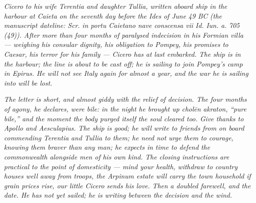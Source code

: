 
\textit{Cicero to his wife Terentia and daughter Tullia,
written aboard ship in the harbour at Caieta on the
seventh day before the Ides of June 49 BC (the
manuscript dateline: \textit{Scr. in portu Caietano
nave conscensa vii Id. Iun. a. 705 (49)}). After more
than four months of paralysed indecision in his Formian
villa --- weighing his consular dignity, his obligation
to Pompey, his promises to Caesar, his terror for his
family --- Cicero has at last embarked. The ship is in
the harbour; the line is about to be cast off; he is
sailing to join Pompey's camp in Epirus. He will not
see Italy again for almost a year, and the war he is
sailing into will be lost.}

\textit{The letter is short, and almost giddy with the
relief of decision. The four months of agony, he
declares, were bile: in the night he brought up
\textit{chol\=en akraton}, ``pure bile,'' and the moment
the body purged itself the soul cleared too. Give thanks
to Apollo and Aesculapius. The ship is good; he will
write to friends from on board commending Terentia and
Tullia to them; he need not urge them to courage,
knowing them braver than any man; he expects in time to
defend the commonwealth alongside men of his own kind.
The closing instructions are practical to the point of
domesticity --- mind your health, withdraw to country
houses well away from troops, the Arpinum estate will
carry the town household if grain prices rise, our
little Cicero sends his love. Then a doubled farewell,
and the date. He has not yet sailed; he is writing
between the decision and the wind.}
